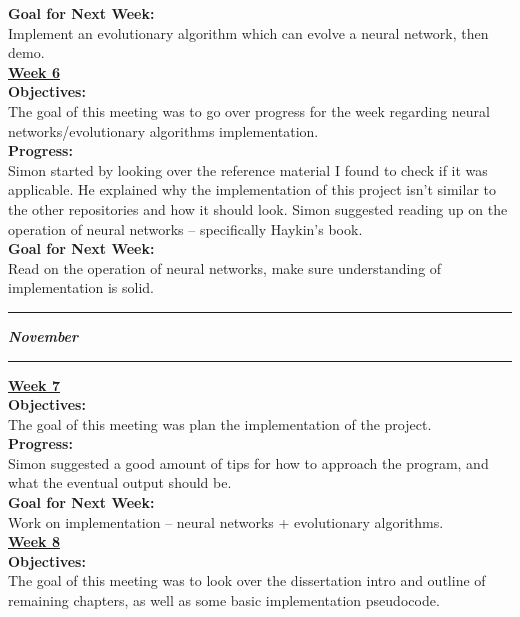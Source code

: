 \documentclass[12pt,a4paper]{article}
\begin{document}
\begin{appendices}
\textbf{Goal for Next Week:} \\
Implement an evolutionary algorithm which can evolve a neural network, then demo. \\

\textbf{\underline{Week 6}} \\
\newline
\textbf{Objectives:} \\
The goal of this meeting was to go over progress for the week regarding neural networks/evolutionary algorithms implementation. \\

\textbf{Progress:} \\
Simon started by looking over the reference material I found to check if it was applicable. He explained why the implementation of this project isn’t similar to the other repositories and how it should look. Simon suggested reading up on the operation of neural networks – specifically Haykin’s book.  \\

\textbf{Goal for Next Week:} \\
Read on the operation of neural networks, make sure understanding of implementation is solid. \\
\hrule

\textbf{\textit{November}}
\newline
\hrule
\textbf{\underline{Week 7}} \\
\newline
\textbf{Objectives:} \\
The goal of this meeting was plan the implementation of the project. \\

\textbf{Progress:} \\
Simon suggested a good amount of tips for how to approach the program, and what the eventual output should be.   \\

\textbf{Goal for Next Week:} \\
Work on implementation – neural networks + evolutionary algorithms. \\

\textbf{\underline{Week 8}} \\
\newline
\textbf{Objectives:} \\
The goal of this meeting was to look over the dissertation intro and outline of remaining chapters, as well as some basic implementation pseudocode. \\


\end{appendices}
\end{document}
